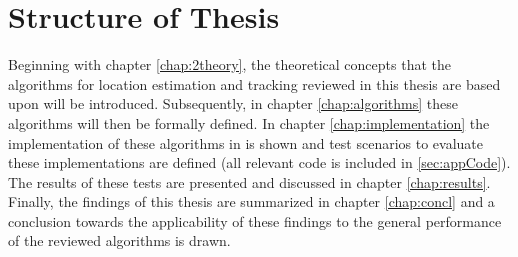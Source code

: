 \section{Structure of Thesis}
\label{chap:1structure}

Beginning with chapter \ref{chap:2theory}, the theoretical concepts that the algorithms for location estimation and tracking reviewed in this thesis are based upon will be introduced. Subsequently, in chapter \ref{chap:algorithms} these algorithms will then be formally defined. In chapter \ref{chap:implementation} the implementation of these algorithms in \matlab is shown and test scenarios to evaluate these implementations are defined (all relevant code is included in \ref{sec:appCode}). The results of these tests are presented and discussed in chapter \ref{chap:results}. Finally, the findings of this thesis are summarized in chapter \ref{chap:concl} and a conclusion towards the applicability of these findings to the general performance of the reviewed algorithms is drawn.
